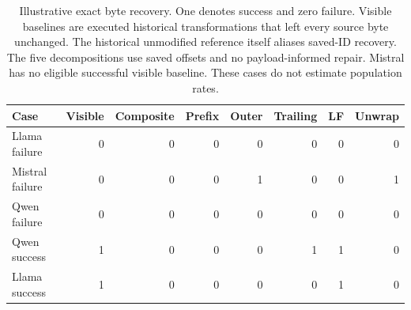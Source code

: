 \begin{table}[H]\centering\small
\begin{tabular}{lrrrrrrr}\toprule
Case & Visible & Composite & Prefix & Outer & Trailing & LF & Unwrap \\ \midrule
Llama failure & 0 & 0 & 0 & 0 & 0 & 0 & 0 \\
Mistral failure & 0 & 0 & 0 & 1 & 0 & 0 & 1 \\
Qwen failure & 0 & 0 & 0 & 0 & 0 & 0 & 0 \\
Qwen success & 1 & 0 & 0 & 0 & 1 & 1 & 0 \\
Llama success & 1 & 0 & 0 & 0 & 0 & 1 & 0 \\
\bottomrule\end{tabular}
\caption{Illustrative exact byte recovery. One denotes success and zero failure. Visible baselines are executed historical transformations that left every source byte unchanged. The historical unmodified reference itself aliases saved-ID recovery. The five decompositions use saved offsets and no payload-informed repair. Mistral has no eligible successful visible baseline. These cases do not estimate population rates.}\label{tab:v4-transport}
\end{table}
